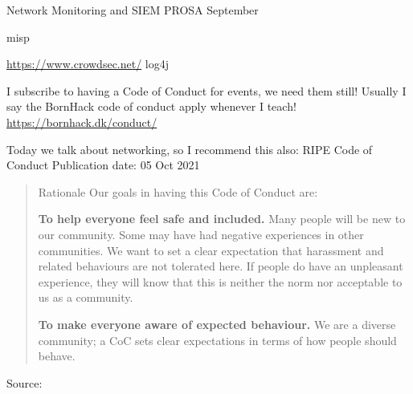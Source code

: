 \documentclass[Screen16to9,17pt]{foils}
\begin{document}
\mytitlepage
{Network Monitoring and SIEM}
{PROSA September \the\year{}}


\hlkprofiluk





\begin{quote}

\end{quote}


misp



\url{https://www.crowdsec.net/} log4j


\begin{list2}
    \item
\end{list2}




I subscribe to having a Code of Conduct for events, we need them still! Usually I say the BornHack code of conduct apply whenever I teach! \url{https://bornhack.dk/conduct/}

Today we talk about networking, so I recommend this also:
RIPE Code of Conduct
Publication date: 05 Oct 2021

\begin{quote}
Rationale
Our goals in having this Code of Conduct are:
\begin{list2}
\item {\bf To help everyone feel safe and included.} Many people will be new to our community. Some may have had negative experiences in other communities. We want to set a clear expectation that harassment and related behaviours are not tolerated here. If people do have an unpleasant experience, they will know that this is neither the norm nor acceptable to us as a community.

\item {\bf To make everyone aware of expected behaviour.} We are a diverse community; a CoC sets clear expectations in terms of how people should behave.
\end{list2}
\end{quote}
Source: {\small
{}}

\end{document}
